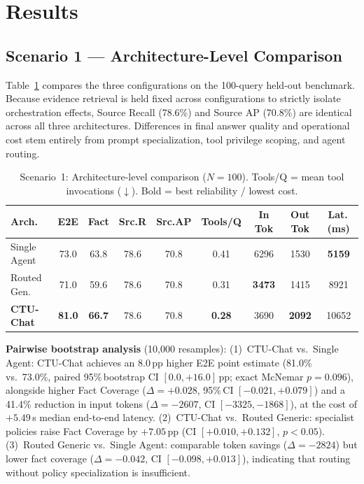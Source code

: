 \section{Results}
\label{sec:results}

\subsection{Scenario 1 --- Architecture-Level Comparison}
\label{sec:s1_results}

Table~\ref{tab:arch_comparison} compares the three configurations on the 100-query held-out benchmark. Because evidence retrieval is held fixed across configurations to strictly isolate orchestration effects, Source Recall (78.6\%) and Source AP (70.8\%) are identical across all three architectures. Differences in final answer quality and operational cost stem entirely from prompt specialization, tool privilege scoping, and agent routing.

\begin{table}[!htbp]
\centering
\caption{Scenario~1: Architecture-level comparison ($N=100$). Tools/Q = mean tool invocations ($\downarrow$). Bold = best reliability / lowest cost.}
\label{tab:arch_comparison}
{\small\setlength{\tabcolsep}{3.5pt}
\begin{tabular}{lcccccccc}
\toprule
\textbf{Arch.} & \textbf{E2E} & \textbf{Fact} & \textbf{Src.R} & \textbf{Src.AP} & \textbf{Tools/Q} & \textbf{In Tok} & \textbf{Out Tok} & \textbf{Lat.\,(ms)} \\
\midrule
Single Agent   & 73.0 & 63.8 & 78.6 & 70.8 & 0.41 & 6296 & 1530 & \textbf{5159} \\
Routed Gen.    & 71.0 & 59.6 & 78.6 & 70.8 & 0.31 & \textbf{3473} & 1415 & 8921 \\
\textbf{CTU-Chat} & \textbf{81.0} & \textbf{66.7} & 78.6 & 70.8 & \textbf{0.28} & 3690 & \textbf{2092} & 10652 \\
\bottomrule
\end{tabular}}
\end{table}

\textbf{Pairwise bootstrap analysis} (10,000 resamples):
(1)~CTU-Chat vs.\ Single Agent: CTU-Chat achieves an 8.0\,pp higher E2E point estimate (81.0\% vs.\ 73.0\%, paired 95\%\,bootstrap CI $[0.0, +16.0]$\,pp; exact McNemar $p = 0.096$), alongside higher Fact Coverage ($\Delta = +0.028$, 95\%\,CI $[-0.021, +0.079]$) and a 41.4\% reduction in input tokens ($\Delta = -2607$, CI $[-3325, -1868]$), at the cost of $+5.49$\,s median end-to-end latency.
(2)~CTU-Chat vs.\ Routed Generic: specialist policies raise Fact Coverage by $+7.05$\,pp (CI $[+0.010, +0.132]$, $p < 0.05$).
(3)~Routed Generic vs.\ Single Agent: comparable token savings ($\Delta = -2824$) but lower fact coverage ($\Delta = -0.042$, CI $[-0.098, +0.013]$), indicating that routing without policy specialization is insufficient.

